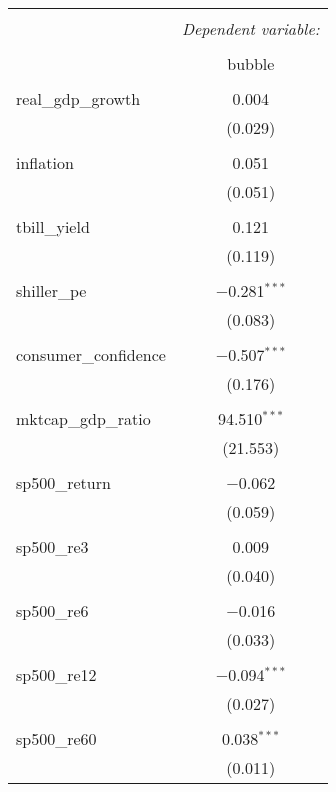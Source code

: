 
\begin{table}[!htbp] \centering 
  \caption{} 
  \label{} 
\begin{tabular}{@{\extracolsep{5pt}}lc} 
\\[-1.8ex]\hline 
\hline \\[-1.8ex] 
 & \multicolumn{1}{c}{\textit{Dependent variable:}} \\ 
\cline{2-2} 
\\[-1.8ex] & bubble \\ 
\hline \\[-1.8ex] 
 real\_gdp\_growth & 0.004 \\ 
  & (0.029) \\ 
  & \\ 
 inflation & 0.051 \\ 
  & (0.051) \\ 
  & \\ 
 tbill\_yield & 0.121 \\ 
  & (0.119) \\ 
  & \\ 
 shiller\_pe & $-$0.281$^{***}$ \\ 
  & (0.083) \\ 
  & \\ 
 consumer\_confidence & $-$0.507$^{***}$ \\ 
  & (0.176) \\ 
  & \\ 
 mktcap\_gdp\_ratio & 94.510$^{***}$ \\ 
  & (21.553) \\ 
  & \\ 
 sp500\_return & $-$0.062 \\ 
  & (0.059) \\ 
  & \\ 
 sp500\_re3 & 0.009 \\ 
  & (0.040) \\ 
  & \\ 
 sp500\_re6 & $-$0.016 \\ 
  & (0.033) \\ 
  & \\ 
 sp500\_re12 & $-$0.094$^{***}$ \\ 
  & (0.027) \\ 
  & \\ 
 sp500\_re60 & 0.038$^{***}$ \\ 
  & (0.011) \\ 

\end{tabular}
\end{table}
